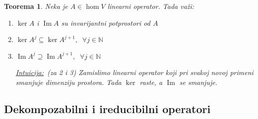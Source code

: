 \documentclass[a4paper,12pt,twoside]{report}
\newtheorem{theorem}{Teorema}[section]
\numberwithin{algorithm}{section}
\newcommand{\intuicija}{\noindent\underline{\textit{Intuicija:}}\ }
\begin{document}
\begin{theorem} \label{teoremaInvarijantiPotprostori1}
    Neka je $A \in \hom V$ linearni operator. Tada važi:
    \begin{enumerate}
        \item $\ker A$ i $\operatorname{Im}A$ su invarijantni potprostori od $A$
        \item $\ker A^j \subseteq \ker A^{j+1}, \;\; \forall j \in \mathbb{N}$
        \item $\operatorname{Im}A^j \supseteq \operatorname{Im}A^{j+1}, \;\; \forall j \in \mathbb{N}$
        
        \intuicija (za 2 i 3) Zamislimo linearni operator koji pri svakoj novoj primeni smanjuje dimenziju prostora. Tada $\ker$ raste, a $\operatorname{Im}$ se smanjuje.
    \end{enumerate}
\end{theorem}

\subsection{Dekompozabilni i ireducibilni operatori}
\end{document}
